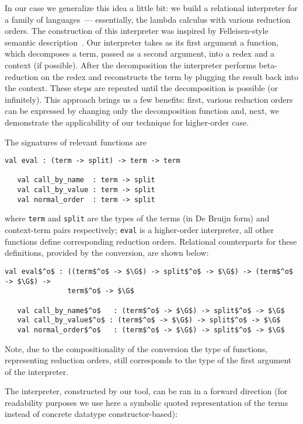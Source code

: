 In our case we generalize this idea a little bit: we build a relational interpreter for a family of languages~--- essentially, the lambda calculus with
various reduction orders. The construction of this interpreter was inspired by Felleisen-style semantic description~\cite{Felleisen}. 
Our interpreter takes as its first argument a function, which decomposes a term, passed as a second argument, into a redex and a context (if possible). 
After the decomposition the interpreter performs beta-reduction on the redex and reconstructs the term by plugging the result back into the context. 
These steps are repeated until the decomposition is possible (or infinitely). This approach brings us a few benefits: first, various reduction orders can be 
expressed by changing only the decomposition function and, next, we demonstrate the applicability of our technique for higher-order case.

The signatures of relevant functions are

\begin{lstlisting}[basicstyle=\small]
   val eval : (term -> split) -> term -> term

   val call_by_name  : term -> split
   val call_by_value : term -> split
   val normal_order  : term -> split
\end{lstlisting}

\noindent where \lstinline|term| and \lstinline|split| are the types of the terms (in De Bruijn form) and context-term pairs respectively; \lstinline|eval| 
is a higher-order interpreter, all other functions define corresponding reduction orders. Relational counterparts for these definitions, provided 
by the conversion, are shown below:

\begin{lstlisting}[basicstyle=\small]
   val eval$^o$ : ((term$^o$ -> $\G$) -> split$^o$ -> $\G$) -> (term$^o$ -> $\G$) -> 
               term$^o$ -> $\G$

   val call_by_name$^o$   : (term$^o$ -> $\G$) -> split$^o$ -> $\G$
   val call_by_value$^o$ : (term$^o$ -> $\G$) -> split$^o$ -> $\G$
   val normal_order$^o$   : (term$^o$ -> $\G$) -> split$^o$ -> $\G$
\end{lstlisting}

Note, due to the compositionality of the conversion the type of functions, representing reduction orders, still corresponds to the type of the first 
argument of the interpreter.

The interpreter, constructed by our tool, can be ran in a forward direction (for readability purposes we use here a symbolic quoted representation of
the terms instead of concrete datatype constructor-based):

